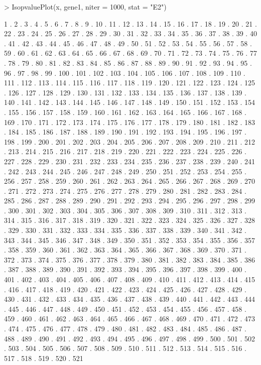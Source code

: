 \documentclass[10pt]{mybook4}
\begin{document}
\begin{Schunk}
\begin{Sinput}
> IsopvaluePlot(x, gene1, niter = 1000, stat = "E2")
\end{Sinput}
\begin{Soutput}
1 . 2 . 3 . 4 . 5 . 6 . 7 . 8 . 9 . 10 . 11 . 12 . 13 . 14 . 15 . 16 . 17 . 18 . 19 . 20 . 21 . 22 . 23 . 24 . 25 . 26 . 27 . 28 . 29 . 30 . 31 . 32 . 33 . 34 . 35 . 36 . 37 . 38 . 39 . 40 . 41 . 42 . 43 . 44 . 45 . 46 . 47 . 48 . 49 . 50 . 51 . 52 . 53 . 54 . 55 . 56 . 57 . 58 . 59 . 60 . 61 . 62 . 63 . 64 . 65 . 66 . 67 . 68 . 69 . 70 . 71 . 72 . 73 . 74 . 75 . 76 . 77 . 78 . 79 . 80 . 81 . 82 . 83 . 84 . 85 . 86 . 87 . 88 . 89 . 90 . 91 . 92 . 93 . 94 . 95 . 96 . 97 . 98 . 99 . 100 . 101 . 102 . 103 . 104 . 105 . 106 . 107 . 108 . 109 . 110 . 111 . 112 . 113 . 114 . 115 . 116 . 117 . 118 . 119 . 120 . 121 . 122 . 123 . 124 . 125 . 126 . 127 . 128 . 129 . 130 . 131 . 132 . 133 . 134 . 135 . 136 . 137 . 138 . 139 . 140 . 141 . 142 . 143 . 144 . 145 . 146 . 147 . 148 . 149 . 150 . 151 . 152 . 153 . 154 . 155 . 156 . 157 . 158 . 159 . 160 . 161 . 162 . 163 . 164 . 165 . 166 . 167 . 168 . 169 . 170 . 171 . 172 . 173 . 174 . 175 . 176 . 177 . 178 . 179 . 180 . 181 . 182 . 183 . 184 . 185 . 186 . 187 . 188 . 189 . 190 . 191 . 192 . 193 . 194 . 195 . 196 . 197 . 198 . 199 . 200 . 201 . 202 . 203 . 204 . 205 . 206 . 207 . 208 . 209 . 210 . 211 . 212 . 213 . 214 . 215 . 216 . 217 . 218 . 219 . 220 . 221 . 222 . 223 . 224 . 225 . 226 . 227 . 228 . 229 . 230 . 231 . 232 . 233 . 234 . 235 . 236 . 237 . 238 . 239 . 240 . 241 . 242 . 243 . 244 . 245 . 246 . 247 . 248 . 249 . 250 . 251 . 252 . 253 . 254 . 255 . 256 . 257 . 258 . 259 . 260 . 261 . 262 . 263 . 264 . 265 . 266 . 267 . 268 . 269 . 270 . 271 . 272 . 273 . 274 . 275 . 276 . 277 . 278 . 279 . 280 . 281 . 282 . 283 . 284 . 285 . 286 . 287 . 288 . 289 . 290 . 291 . 292 . 293 . 294 . 295 . 296 . 297 . 298 . 299 . 300 . 301 . 302 . 303 . 304 . 305 . 306 . 307 . 308 . 309 . 310 . 311 . 312 . 313 . 314 . 315 . 316 . 317 . 318 . 319 . 320 . 321 . 322 . 323 . 324 . 325 . 326 . 327 . 328 . 329 . 330 . 331 . 332 . 333 . 334 . 335 . 336 . 337 . 338 . 339 . 340 . 341 . 342 . 343 . 344 . 345 . 346 . 347 . 348 . 349 . 350 . 351 . 352 . 353 . 354 . 355 . 356 . 357 . 358 . 359 . 360 . 361 . 362 . 363 . 364 . 365 . 366 . 367 . 368 . 369 . 370 . 371 . 372 . 373 . 374 . 375 . 376 . 377 . 378 . 379 . 380 . 381 . 382 . 383 . 384 . 385 . 386 . 387 . 388 . 389 . 390 . 391 . 392 . 393 . 394 . 395 . 396 . 397 . 398 . 399 . 400 . 401 . 402 . 403 . 404 . 405 . 406 . 407 . 408 . 409 . 410 . 411 . 412 . 413 . 414 . 415 . 416 . 417 . 418 . 419 . 420 . 421 . 422 . 423 . 424 . 425 . 426 . 427 . 428 . 429 . 430 . 431 . 432 . 433 . 434 . 435 . 436 . 437 . 438 . 439 . 440 . 441 . 442 . 443 . 444 . 445 . 446 . 447 . 448 . 449 . 450 . 451 . 452 . 453 . 454 . 455 . 456 . 457 . 458 . 459 . 460 . 461 . 462 . 463 . 464 . 465 . 466 . 467 . 468 . 469 . 470 . 471 . 472 . 473 . 474 . 475 . 476 . 477 . 478 . 479 . 480 . 481 . 482 . 483 . 484 . 485 . 486 . 487 . 488 . 489 . 490 . 491 . 492 . 493 . 494 . 495 . 496 . 497 . 498 . 499 . 500 . 501 . 502 . 503 . 504 . 505 . 506 . 507 . 508 . 509 . 510 . 511 . 512 . 513 . 514 . 515 . 516 . 517 . 518 . 519 . 520 . 521 
\end{Soutput}
\end{Schunk}
\end{document}
